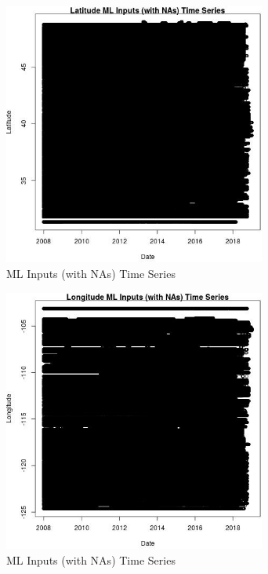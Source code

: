 \begin{figure} 
\centering  
\includegraphics[width=0.77\textwidth]{Code_Outputs/Report_ML_input_PM25_Step4_part_e_de_duplicated_aves2008-18_noNAMwNAs_LatitudevDate.jpg} 
\caption{\label{fig:Report_ML_input_PM25_Step4_part_e_de_duplicated_aves2008-18_noNAMwNAsLatitudevDate}ML Inputs (with NAs) Time Series} 
\end{figure} 
 

\begin{figure} 
\centering  
\includegraphics[width=0.77\textwidth]{Code_Outputs/Report_ML_input_PM25_Step4_part_e_de_duplicated_aves2008-18_noNAMwNAs_LongitudevDate.jpg} 
\caption{\label{fig:Report_ML_input_PM25_Step4_part_e_de_duplicated_aves2008-18_noNAMwNAsLongitudevDate}ML Inputs (with NAs) Time Series} 
\end{figure} 
 

